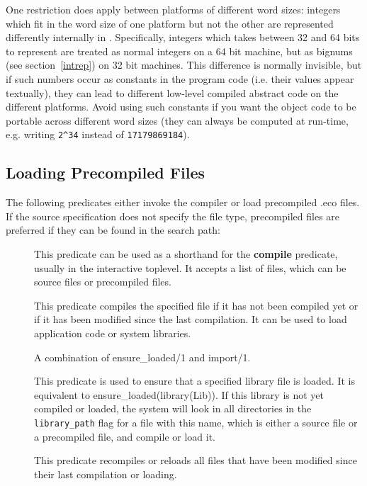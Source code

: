 One restriction does apply between platforms of different
word sizes: integers which fit in the word size of one platform
but not the other are represented differently internally in {\eclipse}. 
Specifically, integers which takes between 32 and 64
bits to represent are treated as normal integers on a 64 bit machine,
but as bignums (see section~\ref{intrep}) on 32 bit machines. This
difference is normally invisible, but if
such numbers occur as constants in the program code (i.e. their values appear
textually), they can lead to different low-level compiled abstract code on
the different platforms. Avoid using such constants if you want
the object code to be portable across different word sizes (they can always
be computed at run-time, e.g. writing \verb'2^34' instead of {\tt 17179869184}).



\subsection{Loading Precompiled Files}
The following predicates either invoke the compiler or load precompiled .eco files.
If the source specification does not specify the file type, precompiled files
are preferred if they can be found in the search path:
\begin{description}
\item[]
This predicate can be used as a shorthand for the {\bf compile} predicate,
usually in the interactive toplevel.
It accepts a list of files, which can be source files or precompiled files.

\item[]
This predicate compiles the specified file if it has not been compiled
yet or if it has been modified since the last compilation.
It can be used to load application code or system libraries.

\item[]
A combination of ensure_loaded/1 and import/1.

\item[]
This predicate is used to ensure that a specified library file is loaded.
It is equivalent to ensure_loaded(library(Lib)).
If this library is not yet compiled or loaded, the system will look
in all directories in the {\tt library_path} flag for a file with this name,
which is either a source file or a precompiled file, and compile or load it.

\item[]
This predicate recompiles or reloads all files that have been modified
since their last compilation or loading.
\end{description}

